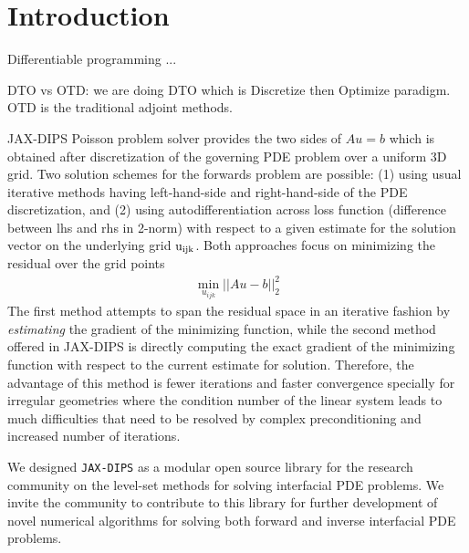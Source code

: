 \documentclass{elsarticle}
\begin{document}
\section{Introduction}
\label{sec::introduction}
Differentiable programming ...

DTO vs OTD: we are doing DTO which is Discretize then Optimize paradigm. OTD is the traditional adjoint methods.

JAX-DIPS Poisson problem solver provides the two sides of $A u =b$ which is obtained after discretization of the governing PDE problem over a uniform 3D grid. Two solution schemes for the forwards problem are possible: (1) using usual iterative methods having left-hand-side and right-hand-side of the PDE discretization, and (2) using autodifferentiation across loss function (difference between lhs and rhs in 2-norm) with respect to a given estimate for the solution vector on the underlying grid $\rm u_{ijk}$. Both approaches focus on minimizing the residual over the grid points
\begin{align*}
	\min_{u_{ijk}} \vert\vert Au -b \vert \vert^2_2
\end{align*}
The first method attempts to span the residual space in an iterative fashion by \textit{estimating} the gradient of the minimizing function, while the second method offered in JAX-DIPS is directly computing the exact gradient of the minimizing function with respect to the current estimate for solution. Therefore, the advantage of this method is fewer iterations and faster convergence specially for irregular geometries where the condition number of the linear system leads to much difficulties that need to be resolved by complex preconditioning and increased number of iterations.



We designed \texttt{JAX-DIPS} as a modular open source library for the research community on the level-set methods for solving interfacial PDE problems. We invite the community to contribute to this library for further development of novel numerical algorithms for solving both forward and inverse interfacial PDE problems.
\end{document}
